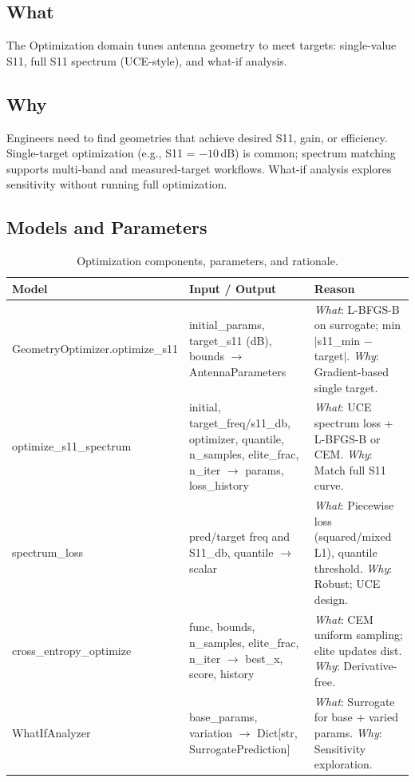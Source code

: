 \documentclass[11pt,a4paper]{article}
\begin{document}
\subsection{What}
The Optimization domain tunes antenna geometry to meet targets: single-value S11, full S11 spectrum (UCE-style), and what-if analysis.

\subsection{Why}
Engineers need to find geometries that achieve desired S11, gain, or efficiency. Single-target optimization (e.g., S11 = $-10$\,dB) is common; spectrum matching supports multi-band and measured-target workflows. What-if analysis explores sensitivity without running full optimization.

\subsection{Models and Parameters}

\begin{table}[htbp]
\centering
\small
\begin{tabularx}{\textwidth}{@{}lXX@{}}
\toprule
\textbf{Model} & \textbf{Input / Output} & \textbf{Reason} \\
\midrule
GeometryOptimizer.optimize\_s11 & initial\_params, target\_s11 (dB), bounds $\to$ AntennaParameters & \emph{What}: L-BFGS-B on surrogate; min $|$s11\_min $-$ target$|$. \emph{Why}: Gradient-based single target. \\
\addlinespace
optimize\_s11\_spectrum & initial, target\_freq/s11\_db, optimizer, quantile, n\_samples, elite\_frac, n\_iter $\to$ params, loss\_history & \emph{What}: UCE spectrum loss + L-BFGS-B or CEM. \emph{Why}: Match full S11 curve. \\
\addlinespace
spectrum\_loss & pred/target freq and S11\_db, quantile $\to$ scalar & \emph{What}: Piecewise loss (squared/mixed L1), quantile threshold. \emph{Why}: Robust; UCE design. \\
\addlinespace
cross\_entropy\_optimize & func, bounds, n\_samples, elite\_frac, n\_iter $\to$ best\_x, score, history & \emph{What}: CEM uniform sampling; elite updates dist. \emph{Why}: Derivative-free. \\
\addlinespace
WhatIfAnalyzer & base\_params, variation $\to$ Dict[str, SurrogatePrediction] & \emph{What}: Surrogate for base + varied params. \emph{Why}: Sensitivity exploration. \\
\bottomrule
\end{tabularx}
\caption{Optimization components, parameters, and rationale.}
\end{table}
\end{document}

